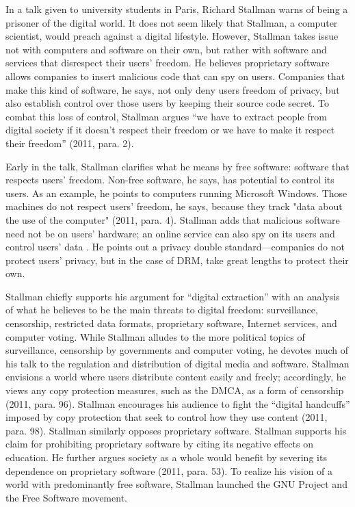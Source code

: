In a talk given to university students in Paris, Richard Stallman warns of
being a prisoner of the digital world. It does not seem likely that Stallman, a
computer scientist, would preach against a digital lifestyle.  However,
Stallman takes issue not with computers and software on their own, but rather
with software and services that disrespect their users' freedom.  He believes
proprietary software allows companies to insert malicious code that can spy on
users. Companies that make this kind of software, he says, not only deny users
freedom of privacy, but also establish control over those users by keeping
their source code secret. To combat this loss of control, Stallman argues “we
have to extract people from digital society if it doesn't respect their freedom
or we have to make it respect their freedom” (2011, para. 2).

Early in the talk, Stallman clarifies what he means by free software: software
that respects users' freedom. Non-free software, he says, has potential to
control its users. As an example, he points to computers running Microsoft
Windows. Those machines do not respect users' freedom, he says, because they
track "data about the use of the computer" (2011, para.  4). Stallman adds that
malicious software need not be on users' hardware; an online service can also
spy on its users and control users' data . He points out a privacy double
standard—companies do not protect users' privacy, but in the case of DRM, take
great lengths to protect their own.

Stallman chiefly supports his argument for “digital extraction” with an
analysis of what he believes to be the main threats to digital freedom:
surveillance, censorship, restricted data formats, proprietary software,
Internet services, and computer voting. While Stallman alludes to the more
political topics of surveillance, censorship by governments and computer
voting, he devotes much of his talk to the regulation and distribution of
digital media and software.  Stallman envisions a world where users distribute
content easily and freely; accordingly, he views any copy protection measures,
such as the DMCA, as a form of censorship (2011, para.  96). Stallman
encourages his audience to fight the “digital handcuffs” imposed by copy
protection that seek to control how they use content (2011, para. 98).
Stallman similarly opposes proprietary software. Stallman supports his claim
for prohibiting proprietary software by citing its negative effects on
education. He further argues society as a whole would benefit by severing
its dependence on proprietary software (2011, para.  53). To realize his
vision of a world with predominantly free software, Stallman launched the
GNU Project and the Free Software movement.

